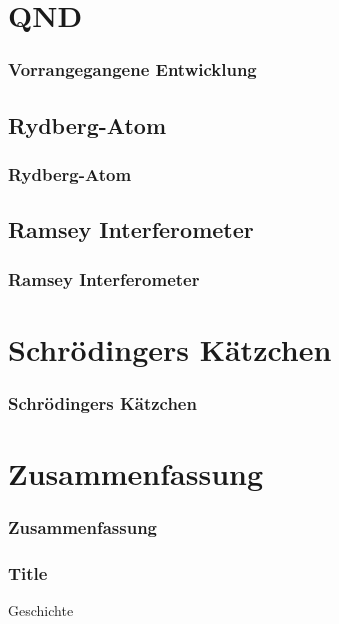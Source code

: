 \documentclass{beamer}
\begin{document}
\section{QND}
\begin{frame}
	\frametitle{Vorrangegangene Entwicklung}
\end{frame}
\subsection{Rydberg-Atom}
\begin{frame}
	\frametitle{Rydberg-Atom}
\end{frame}
\subsection{Ramsey Interferometer}
\begin{frame}
	\frametitle{Ramsey Interferometer}
\end{frame}
\section{Schrödingers Kätzchen}
\begin{frame}
	\frametitle{Schrödingers Kätzchen}
\end{frame}
\section{Zusammenfassung}
\begin{frame}
	\frametitle{Zusammenfassung}
\end{frame}
\begin{frame}
	\frametitle{Title}
	Geschichte
\end{frame}
\end{document}
